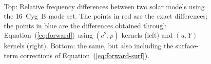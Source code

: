 \begin{figure}
        \centering
        \hspace*{-1cm}%
        \\
        \hspace*{-1cm}%
    \caption[Verifying the forward problem]{Top: Relative frequency differences between two solar models using the 16~Cyg~B mode set. 
    The points in red are the exact differences; the points in blue are the differences obtained through Equation~(\ref{eq:forward}) using ${(c^2, \rho)}$ kernels (left) and ${(u, Y)}$ kernels (right). 
    Bottom: the same, but also including the surface-term corrections of Equation~(\ref{eq:forward-surf}). 
    }
    \label{fig:forward}
\end{figure}


